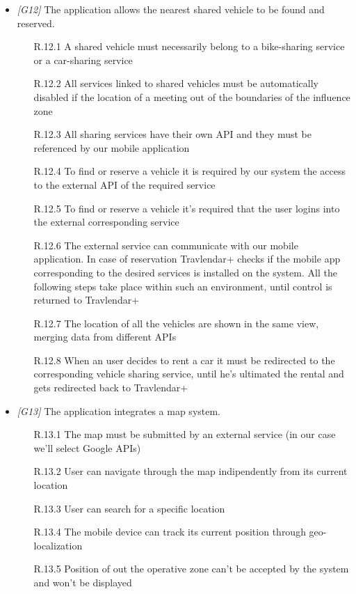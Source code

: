 \begin{itemize}
\item \textit{[G12]} The application allows the nearest shared vehicle to be found and reserved.

                   \begin{itemize}
                        \item [R.12.1] A shared vehicle must necessarily belong to a bike-sharing service or a car-sharing service
                        \item [R.12.2] All services linked to shared vehicles must be automatically disabled if the location of a meeting out of the boundaries of the influence zone
                        \item [R.12.3] All sharing services have their own API and they must be referenced by our mobile application
                        \item [R.12.4] To find or reserve a vehicle it is required by our system the access to the external API of the required service
                        \item [R.12.5] To find or reserve a vehicle it's required that the user logins into the external corresponding service
                        \item [R.12.6] The external service can communicate with our mobile application. In case of reservation Travlendar+ checks if the mobile app corresponding to the desired services is installed on the system. All the following steps take place within such an environment, until control is returned to Travlendar+
                        \item [R.12.7] The location of all the vehicles are shown in the same view, merging data from different APIs
                        \item [R.12.8] When an user decides to rent a car it must be redirected to the corresponding vehicle sharing service, until he's ultimated the rental and gets redirected back to Travlendar+
                        \end{itemize}

\item \textit{[G13]} The application integrates a map system.
                   
                  \begin{itemize}
                        \item [R.13.1] The map must be submitted by an external service (in our case we'll select Google APIs)
                        \item [R.13.2] User can navigate through the map indipendently from its current location
                        \item [R.13.3] User can search for a specific location
                        \item [R.13.4] The mobile device can track its current position through geo-localization
                        \item [R.13.5] Position of out the operative zone can't be accepted by the system and won't be displayed
                   \end{itemize}


\end{itemize}
